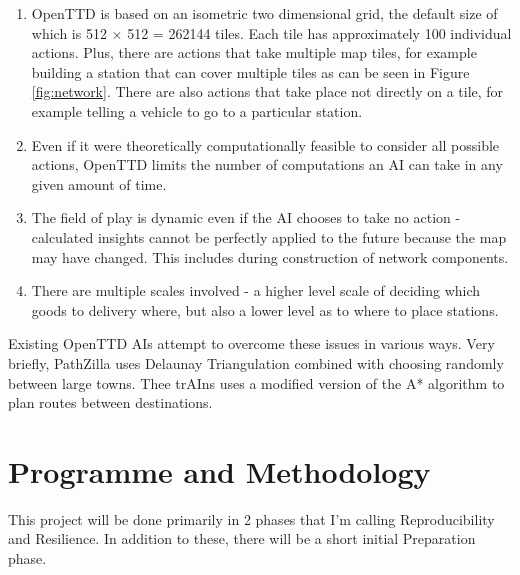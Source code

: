 \documentclass[a4paper,11pt]{article}
\begin{document}
\begin{enumerate}

\item OpenTTD is based on an isometric two dimensional grid, the default size of which is 512 $\times$ 512 = 262144 tiles. Each tile has approximately 100 individual actions. Plus, there are actions that take multiple map tiles, for example building a station that can cover multiple tiles as can be seen in Figure \ref{fig:network}. There are also actions that take place not directly on a tile, for example telling a vehicle to go to a particular station.

\item Even if it were theoretically computationally feasible to consider all possible actions, OpenTTD limits the number of computations an AI can take in any given amount of time.

\item The field of play is dynamic even if the AI chooses to take no action - calculated insights cannot be perfectly applied to the future because the map may have changed. This includes during construction of network components.

\item There are multiple scales involved - a higher level scale of deciding which goods to delivery where, but also a lower level as to where to place stations.

\end{enumerate}

Existing OpenTTD AIs attempt to overcome these issues in various ways. Very briefly, PathZilla \cite{pathzilla} uses Delaunay Triangulation combined with choosing randomly between large towns. Thee trAIns \cite{rios_trains_2009} uses a modified version of the A* algorithm to plan routes between destinations. 

\section{Programme and Methodology}

This project will be done primarily in 2 phases that I'm calling Reproducibility and Resilience. In addition to these, there will be a short initial Preparation phase.
\end{document}
